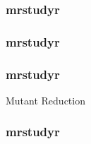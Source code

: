 \begin{frame}
    \frametitle{mrstudyr}
    \begin{figure}[!htb]
    \centering
    
    \end{figure}
  \end{frame}

  \begin{frame}
    \frametitle{mrstudyr}
    \centering
    {\fontsize{40}{40}\selectfont{Retrospective Mutant Reduction}}
  \end{frame}

  \begin{frame}
    \frametitle{mrstudyr}
    \centering
    {\fontsize{40}{40}\selectfont{\textcolor{solarizedViolet}{Retrospective}} Mutant Reduction}
  \end{frame}

  \begin{frame}
    \frametitle{mrstudyr}
    \centering
    {\fontsize{40}{40}}
  \end{frame}
